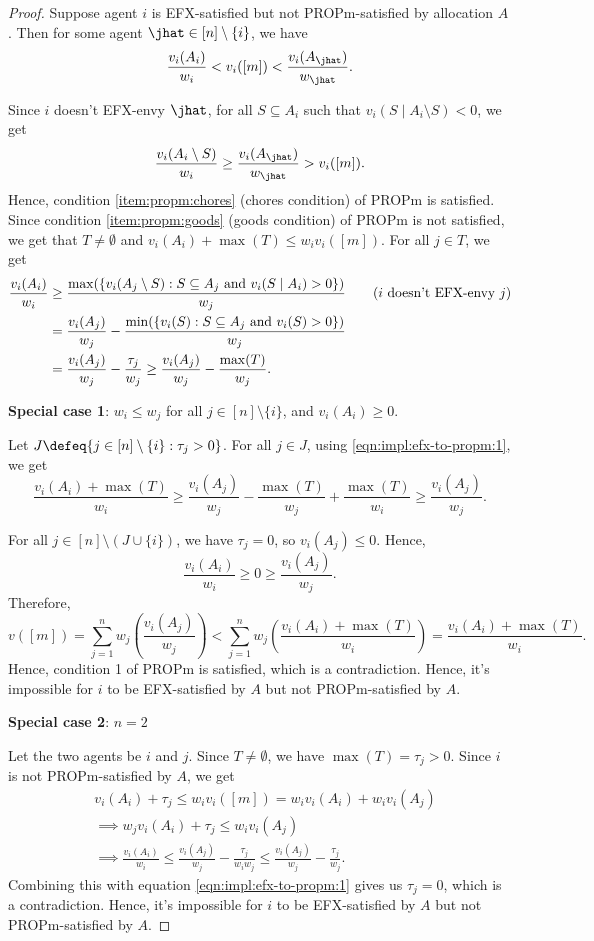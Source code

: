 \begin{proof}
Suppose agent $i$ is EFX-satisfied but not PROPm-satisfied by allocation $A$.
Then for some agent $\jhat \in [n] \setminus \{i\}$, we have
\[ \frac{v_i(A_i)}{w_i} < v_i([m]) < \frac{v_i(A_{\jhat})}{w_{\jhat}}. \]

Since $i$ doesn't EFX-envy $\jhat$, for all $S \subseteq A_i$ such that
$v_i(S \mid A_i \setminus S) < 0$, we get
\[ \frac{v_i(A_i \setminus S)}{w_i} \ge \frac{v_i(A_{\jhat})}{w_{\jhat}} > v_i([m]). \]
Hence, condition \ref{item:propm:chores} (chores condition) of PROPm is satisfied.
Since condition \ref{item:propm:goods} (goods condition) of PROPm is not satisfied, we get that
$T \neq \emptyset$ and $v_i(A_i) + \max(T) \le w_iv_i([m])$.
%
For all $j \in T$, we get
\begin{align}
\frac{v_i(A_i)}{w_i} &\ge \frac{\max(\{v_i(A_j \setminus S): S \subseteq A_j \textrm{ and } v_i(S \mid A_i) > 0\})}{w_j}
    \tag{$i$ doesn't EFX-envy $j$}
\\ &= \frac{v_i(A_j)}{w_j} - \frac{\min(\{v_i(S): S \subseteq A_j \textrm{ and } v_i(S) > 0\})}{w_j}
    \notag
\\ &= \frac{v_i(A_j)}{w_j} - \frac{\tau_j}{w_j} \ge \frac{v_i(A_j)}{w_j} - \frac{\max(T)}{w_j}.
    \label{eqn:impl:efx-to-propm:1}
\end{align}

\textbf{Special case 1}: $w_i \le w_j$ for all $j \in [n] \setminus \{i\}$, and $v_i(A_i) \ge 0$.

Let $J \defeq \{j \in [n] \setminus \{i\}: \tau_j > 0\}$.
For all $j \in J$, using \eqref{eqn:impl:efx-to-propm:1}, we get
\[ \frac{v_i(A_i) + \max(T)}{w_i}
\ge \frac{v_i(A_j)}{w_j} - \frac{\max(T)}{w_j} + \frac{\max(T)}{w_i}
\ge \frac{v_i(A_j)}{w_j}. \]

For all $j \in [n] \setminus (J \cup \{i\})$, we have $\tau_j = 0$, so $v_i(A_j) \le 0$. Hence,
\[ \frac{v_i(A_i)}{w_i} \ge 0 \ge \frac{v_i(A_j)}{w_j}. \]
Therefore,
\[ v([m]) = \sum_{j=1}^n w_j\left(\frac{v_i(A_j)}{w_j}\right)
    < \sum_{j=1}^n w_j\left(\frac{v_i(A_i) + \max(T)}{w_i}\right)
    = \frac{v_i(A_i) + \max(T)}{w_i}. \]
Hence, condition 1 of PROPm is satisfied, which is a contradiction.
Hence, it's impossible for $i$ to be EFX-satisfied by $A$ but not PROPm-satisfied by $A$.

\textbf{Special case 2}: $n=2$

Let the two agents be $i$ and $j$. Since $T \neq \emptyset$, we have $\max(T) = \tau_j > 0$.
Since $i$ is not PROPm-satisfied by $A$, we get
\begin{align}
& v_i(A_i) + \tau_j \le w_iv_i([m]) = w_iv_i(A_i) + w_iv_i(A_j)
\\ &\implies w_jv_i(A_i) + \tau_j \le w_iv_i(A_j)
\\ &\implies \frac{v_i(A_i)}{w_i} \le \frac{v_i(A_j)}{w_j} - \frac{\tau_j}{w_iw_j}
    \le \frac{v_i(A_j)}{w_j} - \frac{\tau_j}{w_j}.
\end{align}
Combining this with equation \eqref{eqn:impl:efx-to-propm:1} gives us $\tau_j = 0$, which is a contradiction.
Hence, it's impossible for $i$ to be EFX-satisfied by $A$ but not PROPm-satisfied by $A$.
\end{proof}

